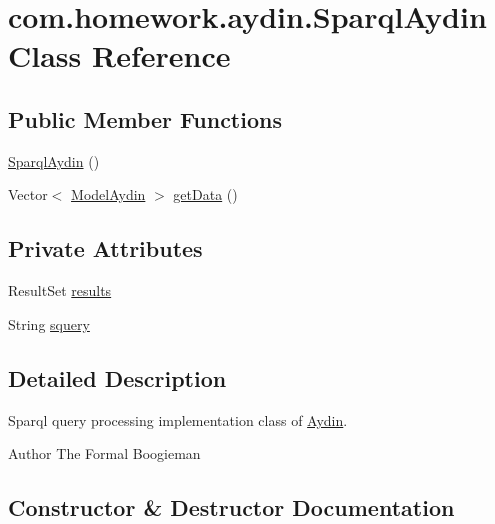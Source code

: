 \hypertarget{classcom_1_1homework_1_1aydin_1_1_sparql_aydin}{}\section{com.\+homework.\+aydin.\+Sparql\+Aydin Class Reference}
\label{classcom_1_1homework_1_1aydin_1_1_sparql_aydin}
\subsection*{Public Member Functions}
\begin{DoxyCompactItemize}
\item 
\hyperlink{classcom_1_1homework_1_1aydin_1_1_sparql_aydin_a04b98701b1a3aa03dc2dd39502bd6155}{Sparql\+Aydin} ()
\item 
Vector$<$ \hyperlink{classcom_1_1homework_1_1aydin_1_1_model_aydin}{Model\+Aydin} $>$ \hyperlink{classcom_1_1homework_1_1aydin_1_1_sparql_aydin_ac7922de5a74ecd34598d1254699f17dd}{get\+Data} ()
\end{DoxyCompactItemize}
\subsection*{Private Attributes}
\begin{DoxyCompactItemize}
\item 
Result\+Set \hyperlink{classcom_1_1homework_1_1aydin_1_1_sparql_aydin_ac9dc7c9e7d107274e7034dc9448742b2}{results}
\item 
String \hyperlink{classcom_1_1homework_1_1aydin_1_1_sparql_aydin_ace2a9ff0a89fec9f4643590344c57e30}{squery}
\end{DoxyCompactItemize}


\subsection{Detailed Description}
Sparql query processing implementation class of \hyperlink{classcom_1_1homework_1_1aydin_1_1_aydin}{Aydin}. \begin{DoxyAuthor}{Author}
The Formal Boogieman 
\end{DoxyAuthor}


\subsection{Constructor \& Destructor Documentation}
